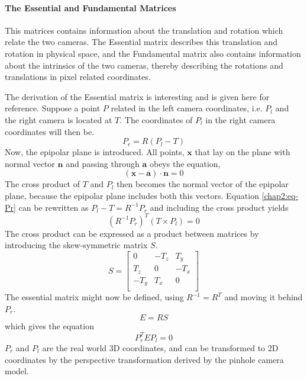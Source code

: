 \paragraph{The Essential and Fundamental Matrices}
This matrices contains information about the translation and rotation which relate the
two cameras. The Essential matrix describes this translation and rotation in physical
space, and the Fundamental matrix also contains information about the intrinsics of the
two cameras, thereby describing the rotations and translations in pixel related
coordinates.

The derivation of the Essential matrix is interesting and is given here for reference.
Suppose a point $P$ related in the left camera coordinates, i.e. $P_l$ and the right
camera is located at $T$. The coordinates of $P_l$ in the right camera coordinates will
then be.
\begin{equation}
    \label{chap2:eq-Pr}
    P_r = R (P_l - T)
\end{equation}
Now, the epipolar plane is introduced. All points, $\mathbf{x}$ that lay on the plane with normal vector
$\mathbf{n}$ and passing through $\mathbf{a}$ obeys the equation,
\begin{equation*}
    (\mathbf{x} - \mathbf{a}) \cdot \mathbf{n} = 0
\end{equation*}
The cross product of $T$ and $P_l$ then becomes the normal vector of the epipolar plane,
because the epipolar plane includes both this vectors. Equation \eqref{chap2:eq-Pr} can be
rewritten as $P_l - T = R^{-1} P_r$ and including the cross product yields 
\begin{equation}
    (R^{-1} P_r)^T (T \times P_l) = 0
\end{equation}
The cross product can be expressed as a product between matrices by introducing the
skew-symmetric matrix $S$. \cite{modsim}
\begin{equation}
    S = \left [ \begin{array}{ccc}
                0 & -T_z & T_y \\
                T_z & 0 & -T_x \\
                -T_y & T_x & 0 \\ \end{array} \right]
\end{equation}
The essential matrix might now be defined, using $R^{-1} = R^T$ and moving it behind $P_r$.
\begin{equation}
    E = RS 
\end{equation}
which gives the equation
\begin{equation}
    \label{chap2:eq-fundamental}
    P_r^T E P_l = 0
\end{equation}
$P_r$ and $P_l$ are the real world 3D coordinates, and can be transformed to 2D
coordinates by the perspective transformation derived by the pinhole camera model. 

